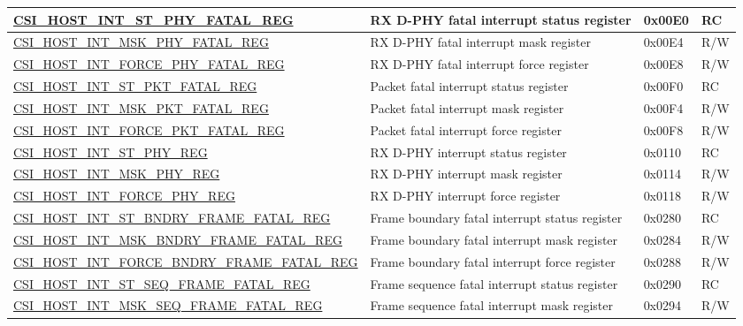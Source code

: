 \begin{longtable}{ | p{9cm} | p{10cm} | p{1.3cm} | p{1.2cm} | }
\hyperref[regdesc:CSIHOSTINTSTPHYFATALREG]{CSI\_HOST\_INT\_ST\_PHY\_FATAL\_REG} & RX D-PHY fatal interrupt status register & 0x00E0 & RC \\ \hline
\hyperref[regdesc:CSIHOSTINTMSKPHYFATALREG]{CSI\_HOST\_INT\_MSK\_PHY\_FATAL\_REG} & RX D-PHY fatal interrupt mask register & 0x00E4 & R/W \\ \hline
\hyperref[regdesc:CSIHOSTINTFORCEPHYFATALREG]{CSI\_HOST\_INT\_FORCE\_PHY\_FATAL\_REG} & RX D-PHY fatal interrupt force register & 0x00E8 & R/W \\ \hline
\hyperref[regdesc:CSIHOSTINTSTPKTFATALREG]{CSI\_HOST\_INT\_ST\_PKT\_FATAL\_REG} & Packet fatal interrupt status register & 0x00F0 & RC \\ \hline
\hyperref[regdesc:CSIHOSTINTMSKPKTFATALREG]{CSI\_HOST\_INT\_MSK\_PKT\_FATAL\_REG} & Packet fatal interrupt mask register & 0x00F4 & R/W \\ \hline
\hyperref[regdesc:CSIHOSTINTFORCEPKTFATALREG]{CSI\_HOST\_INT\_FORCE\_PKT\_FATAL\_REG} & Packet fatal interrupt force register & 0x00F8 & R/W \\ \hline
\hyperref[regdesc:CSIHOSTINTSTPHYREG]{CSI\_HOST\_INT\_ST\_PHY\_REG} & RX D-PHY interrupt status register & 0x0110 & RC \\ \hline
\hyperref[regdesc:CSIHOSTINTMSKPHYREG]{CSI\_HOST\_INT\_MSK\_PHY\_REG} & RX D-PHY interrupt mask register & 0x0114 & R/W \\ \hline
\hyperref[regdesc:CSIHOSTINTFORCEPHYREG]{CSI\_HOST\_INT\_FORCE\_PHY\_REG} & RX D-PHY interrupt force register & 0x0118 & R/W \\ \hline
\hyperref[regdesc:CSIHOSTINTSTBNDRYFRAMEFATALREG]{CSI\_HOST\_INT\_ST\_BNDRY\_FRAME\_FATAL\_REG} & Frame boundary fatal interrupt status register & 0x0280 & RC \\ \hline
\hyperref[regdesc:CSIHOSTINTMSKBNDRYFRAMEFATALREG]{CSI\_HOST\_INT\_MSK\_BNDRY\_FRAME\_FATAL\_REG} & Frame boundary fatal interrupt mask register & 0x0284 & R/W \\ \hline
\hyperref[regdesc:CSIHOSTINTFORCEBNDRYFRAMEFATALREG]{CSI\_HOST\_INT\_FORCE\_BNDRY\_FRAME\_FATAL\_REG} & Frame boundary fatal interrupt force register & 0x0288 & R/W \\ \hline
\hyperref[regdesc:CSIHOSTINTSTSEQFRAMEFATALREG]{CSI\_HOST\_INT\_ST\_SEQ\_FRAME\_FATAL\_REG} & Frame sequence fatal interrupt status register & 0x0290 & RC \\ \hline
\hyperref[regdesc:CSIHOSTINTMSKSEQFRAMEFATALREG]{CSI\_HOST\_INT\_MSK\_SEQ\_FRAME\_FATAL\_REG} & Frame sequence fatal interrupt mask register & 0x0294 & R/W \\ \hline

\end{longtable}
